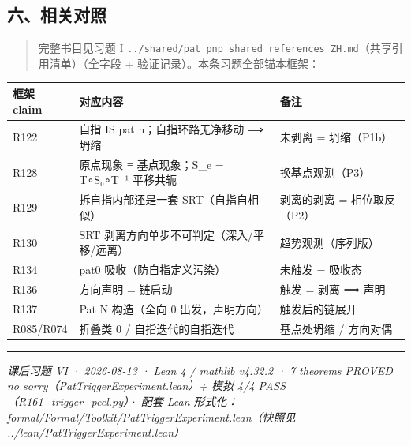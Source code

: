 \documentclass[
]{article}
\newcounter{none} %
\begin{document}
\subsection{六、相关对照}\label{ux516dux76f8ux5173ux5bf9ux7167}

\begin{quote}
完整书目见习题 I
\texttt{../shared/pat\_pnp\_shared\_references\_ZH.md}（共享引用清单）（全字段
+ 验证记录）。本条习题全部锚本框架：
\end{quote}

{\def\LTcaptype{none} %
\begin{longtable}[]{@{}
 >{\raggedright\arraybackslash}p{}
 >{\raggedright\arraybackslash}p{}
 >{\raggedright\arraybackslash}p{}@{}}
\toprule\noalign{}
\begin{minipage}[b]{\linewidth}\raggedright
框架 claim
\end{minipage} & \begin{minipage}[b]{\linewidth}\raggedright
对应内容
\end{minipage} & \begin{minipage}[b]{\linewidth}\raggedright
备注
\end{minipage} \\
\midrule\noalign{}
\endhead
\bottomrule\noalign{}
\endlastfoot
R122 & 自指 IS pat n；自指环路无净移动 ⟹ 坍缩 & 未剥离 = 坍缩（P1b） \\
R128 & 原点现象 ≡ 基点现象；S\_e = T∘S₀∘T⁻¹ 平移共轭 &
换基点观测（P3） \\
R129 & 拆自指内部还是一套 SRT（自指自相似） & 剥离的剥离 =
相位取反（P2） \\
R130 & SRT 剥离方向单步不可判定（深入/平移/远离） &
趋势观测（序列版） \\
R134 & pat0 吸收（防自指定义污染） & 未触发 = 吸收态 \\
R136 & 方向声明 = 链启动 & 触发 = 剥离 ⟹ 声明 \\
R137 & Pat N 构造（全向 0 出发，声明方向） & 触发后的链展开 \\
R085/R074 & 折叠类 0 / 自指迭代的自指迭代 & 基点处坍缩 / 方向对偶 \\
\end{longtable}
}

\begin{center}\rule{0.5\linewidth}{0.5pt}\end{center}

\emph{课后习题 VI · 2026-08-13 · Lean 4 / mathlib v4.32.2 · 7
theorems PROVED no sorry（PatTriggerExperiment.lean）+ 模拟 4/4
PASS（R161\_trigger\_peel.py）· 配套 Lean
形式化：formal/Formal/Toolkit/PatTriggerExperiment.lean（快照见
../lean/PatTriggerExperiment.lean）}
\end{document}
